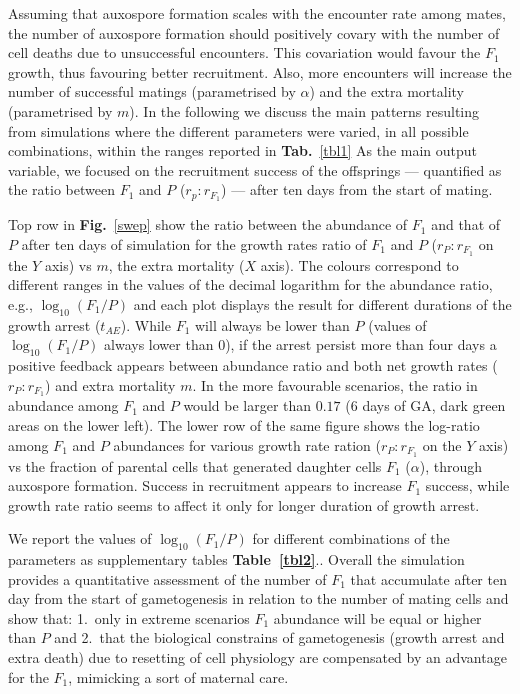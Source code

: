 \documentclass[a4paper,oneside]{article}
\begin{document}
    Assuming that auxospore formation scales with the encounter rate among mates, the number of auxospore formation should positively covary with the number of cell deaths due to unsuccessful encounters.
    This covariation would favour the $F_{1}$ growth, thus favouring better recruitment.
    Also, more encounters will increase the number of successful matings (parametrised by $\alpha$) and the extra mortality (parametrised by $m$).
    In the following we discuss the main patterns resulting from simulations where the different parameters were varied, in all possible combinations, within the ranges reported in \textbf{Tab.}~\ref{tbl1}
    As the main output variable, we focused on the recruitment success of the offsprings --- quantified as the ratio between $F_{1}$ and $P$ ($r_p : r_{F_{1}}$) --- after ten days from the start of mating.

    Top row in \textbf{Fig.}~\ref{swep} show the ratio between the abundance of $F_{1}$ and that of $P$ after ten days of simulation for the growth rates ratio of $F_{1}$ and $P$ ($r_P : r_{F_{1}}$ on the $Y$ axis) vs $m$, the extra mortality ($X$ axis).
    The colours correspond to different ranges in the values of the decimal logarithm for the abundance ratio, e.g., $\log_{10}(F_{1}/P)$ and each plot displays the result for different durations of the growth arrest ($t_{AE}$).
    While $F_{1}$ will always be lower than $P$ (values of $\log_{10}(F_{1}/P)$ always lower than $0$), if the arrest persist more than four days a positive feedback appears between  abundance ratio and both net growth rates ($r_P : r_{F_{1}}$) and extra mortality $m$.
    In the more favourable scenarios, the ratio in abundance among $F_{1}$ and $P$ would be larger than $0.17$ (6 days of GA, dark green areas on the lower left).
    The lower row of the same figure shows the log-ratio among $F_{1}$ and $P$ abundances for various growth rate ration ($r_P : r_{F_{1}}$ on the $Y$ axis) vs the fraction of parental cells that generated daughter cells $F_{1}$ ($\alpha$), through auxospore formation.
    Success in recruitment appears to increase $F_{1}$ success, while growth rate ratio seems to affect it only for longer duration of growth arrest.

    We report the values of $\log_{10}(F_{1}/P)$ for different combinations of the parameters as supplementary tables \textbf{Table~\ref{tbl2}}..
    Overall the simulation provides a quantitative assessment of the number of $F_{1}$ that accumulate after ten day from the start of gametogenesis in relation to the number of mating cells and show that:
    1.\ only in extreme scenarios $F_{1}$ abundance will be equal or higher than $P$ and
    2.\ that the biological constrains of gametogenesis (growth arrest and extra death) due to resetting of cell physiology are compensated by an advantage for the $F_{1}$, mimicking a sort of maternal care.
\end{document}
